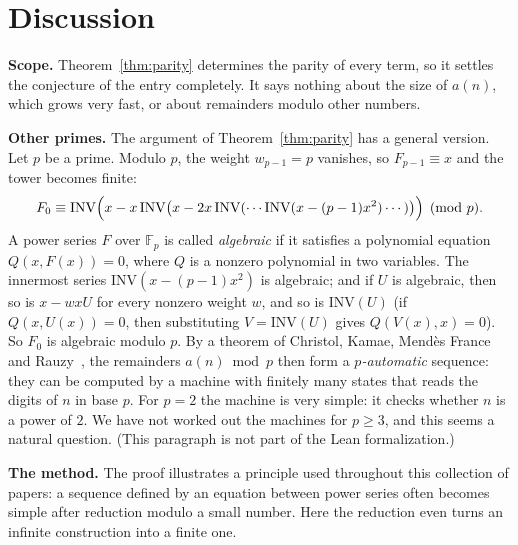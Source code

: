 \documentclass[11pt,a4paper]{article}
\theoremstyle{definition}
\theoremstyle{remark}
\newcommand{\F}{\mathbb{F}}
\newcommand{\para}[1]{\par\medskip\noindent\textbf{#1}\enspace}
\begin{document}
\section{Discussion}\label{sec:discussion}

\para{Scope.} Theorem~\ref{thm:parity} determines the parity of every term, so it settles the conjecture of the entry
completely. It says nothing about the size of $a(n)$, which grows very fast, or about remainders modulo other numbers.

\para{Other primes.} The argument of Theorem~\ref{thm:parity} has a general version. Let $p$ be a prime. Modulo $p$, the
weight $w_{p-1}=p$ vanishes, so $F_{p-1}\equiv x$ and the tower becomes finite:
\[
F_0\equiv\mathrm{INV}\Bigl(x-x\,\mathrm{INV}\bigl(x-2x\,\mathrm{INV}(\cdots\mathrm{INV}(x-(p-1)x^2)\cdots)\bigr)\Bigr)
\pmod p .
\]
A power series $F$ over $\F_p$ is called \emph{algebraic} if it satisfies a polynomial equation $Q(x,F(x))=0$, where $Q$
is a nonzero polynomial in two variables. The innermost series $\mathrm{INV}(x-(p-1)x^2)$ is algebraic; and if $U$ is
algebraic, then so is $x-wxU$ for every nonzero weight $w$, and so is $\mathrm{INV}(U)$ (if $Q(x,U(x))=0$, then
substituting $V=\mathrm{INV}(U)$ gives $Q(V(x),x)=0$). So $F_0$ is algebraic modulo $p$. By a theorem of Christol, Kamae,
Mend\`es France and Rauzy~\cite{christol,allouche}, the remainders $a(n)\bmod p$ then form a \emph{$p$-automatic}
sequence: they can be computed by a machine with finitely many states that reads the digits of $n$ in base $p$. For
$p=2$ the machine is very simple: it checks whether $n$ is a power of $2$. We have not worked out the machines for
$p\ge3$, and this seems a natural question. (This paragraph is not part of the Lean formalization.)

\para{The method.} The proof illustrates a principle used throughout this collection of papers: a sequence defined by an
equation between power series often becomes simple after reduction modulo a small number. Here the reduction even turns
an infinite construction into a finite one.
\end{document}
